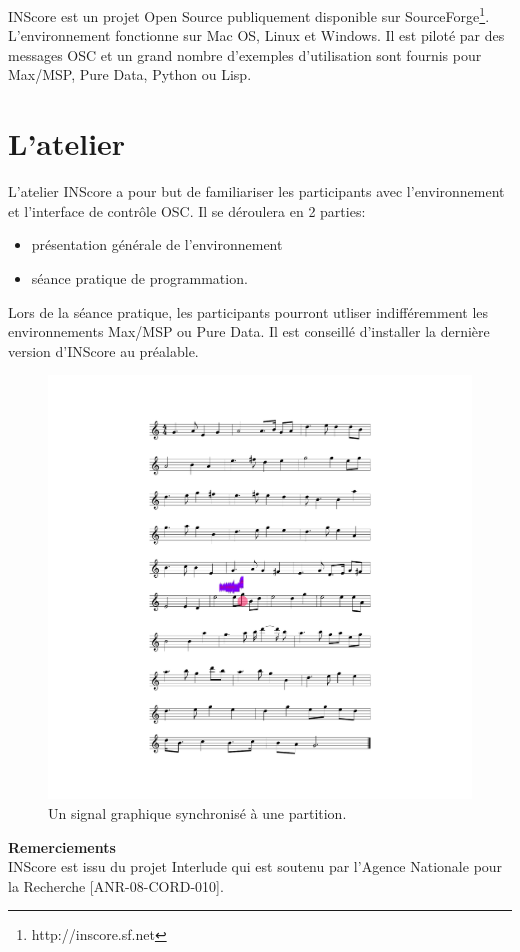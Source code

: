 \documentclass{article}
\begin{document}
INScore est un projet Open Source publiquement disponible sur SourceForge\footnote{http://inscore.sf.net}. L'environnement fonctionne sur Mac OS, Linux et Windows. Il est piloté par des messages OSC \cite{wright02} et un grand nombre d'exemples d'utilisation sont fournis pour Max/MSP, Pure Data, Python ou Lisp.

\section{L'atelier}

L'atelier INScore a pour but de familiariser les participants avec l'environnement et l'interface de contrôle OSC. Il se déroulera en 2 parties:
\begin{itemize}
\item présentation générale de l'environnement
\item séance pratique de programmation.
\end{itemize}

Lors de la séance pratique, les participants pourront utliser indifféremment les environnements Max/MSP ou Pure Data. Il est conseillé d'installer la dernière version d'INScore au préalable.


\begin{figure}
\centerline{
	\includegraphics[width=0.95\columnwidth]{scene1}}
\caption{Un signal graphique synchronisé à une partition.}
\label{fig:example}
\end{figure}



\vspace{4mm}
\hspace{-5mm}
\textbf{Remerciements} \\
INScore est issu du projet Interlude qui est soutenu par l'Agence Nationale pour la Recherche [ANR-08-CORD-010].



\end{document}
